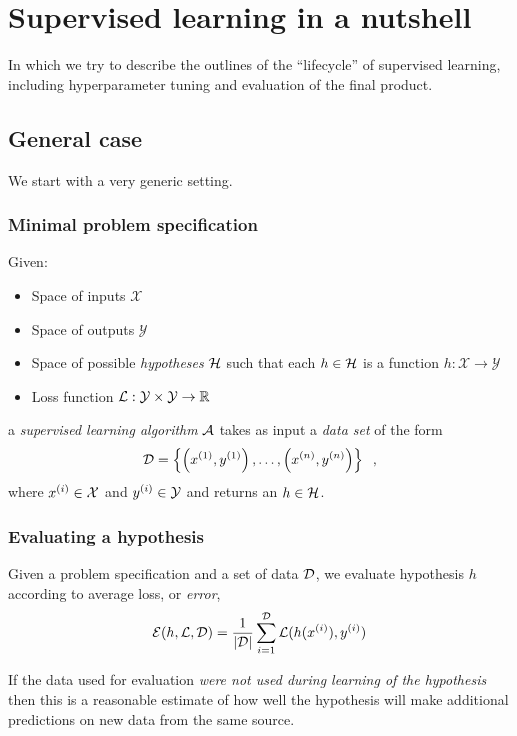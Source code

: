 \chapter{Supervised learning in a nutshell}
\label{sec-nutshell}

In which we try to describe the outlines of the ``lifecycle'' of
supervised learning, including hyperparameter tuning and evaluation of
the final product.

\section{General case}

We start with a very generic setting.

\subsection{Minimal problem specification}
Given:
\begin{itemize}
  \item Space of inputs $\mathcal{X}$
  \item Space of outputs $\mathcal{Y}$
  \item Space of possible {\em hypotheses} ${\cal H}$ such that each
        $h \in {\cal H}$ is a function
        $h: \mathcal{X} \rightarrow \mathcal{Y}$
  \item Loss function $\mathcal{L} : \mathcal{Y} \times \mathcal{Y}
          \rightarrow \mathbb{R}$
\end{itemize}
a {\em supervised learning algorithm} $\mathcal{A}$
takes as input a {\em data set} of the form
\[{\cal D} = \left\{\left(x^{(1)}, y^{(1)}\right), \dots,
  \left(x^{(n)}, y^{(n)}\right)\right\}\;\;,\]
where $x^{(i)} \in \mathcal{X}$ and $y^{(i)} \in \mathcal{Y}$
and returns an $h \in {\cal H}$.

\subsection{Evaluating a hypothesis}
Given a problem specification and a set of data ${\cal D}$, we
evaluate hypothesis $h$ according to average loss, or {\em error},
\begin{eqnarray*}
  \mathcal{E}(h, \mathcal{L}, {\cal D}) = \frac{1}{|{\cal D}|}\sum_{i = 1}^{{\cal D}}
  \mathcal{L}(h(x^{(i)}), y^{(i)})
\end{eqnarray*}

If the data used for evaluation {\em were not used during learning
    of the hypothesis} then this is a reasonable estimate of how well
the hypothesis will make additional predictions on new data from the
same source.

